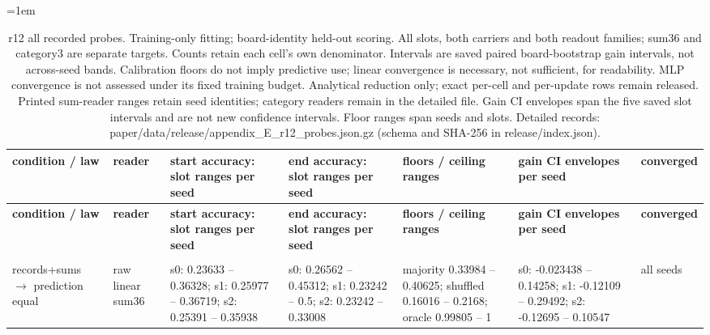 \begingroup\fontsize{8}{9.5}\selectfont\setlength{\tabcolsep}{3pt}\emergencystretch=1em
\begin{longtable}{@{}>{\raggedright\arraybackslash}p{1.392in}>{\raggedright\arraybackslash}p{0.576in}>{\raggedright\arraybackslash}p{0.816in}>{\raggedright\arraybackslash}p{0.816in}>{\raggedright\arraybackslash}p{0.960in}>{\raggedright\arraybackslash}p{0.864in}>{\raggedright\arraybackslash}p{0.576in}@{}}
\caption{r12 all recorded probes. Training-only fitting; board-identity held-out scoring. All slots, both carriers and both readout families; sum36 and category3 are separate targets. Counts retain each cell's own denominator. Intervals are saved paired board-bootstrap gain intervals, not across-seed bands. Calibration floors do not imply predictive use; linear convergence is necessary, not sufficient, for readability. MLP convergence is not assessed under its fixed training budget. Analytical reduction only; exact per-cell and per-update rows remain released. Printed sum-reader ranges retain seed identities; category readers remain in the detailed file. Gain CI envelopes span the five saved slot intervals and are not new confidence intervals. Floor ranges span seeds and slots. Detailed records: paper/\allowbreak{}data/\allowbreak{}release/\allowbreak{}appendix\_\allowbreak{}E\_\allowbreak{}r12\_\allowbreak{}probes.json.gz (schema and SHA-256 in release/\allowbreak{}index.json).}\label{tab:appendix_E_r12_probes}\\
\toprule
\textbf{condition /\allowbreak{} law} & \textbf{reader} & \textbf{start accuracy: slot ranges per seed} & \textbf{end accuracy: slot ranges per seed} & \textbf{floors /\allowbreak{} ceiling ranges} & \textbf{gain CI envelopes per seed} & \textbf{converged} \\
\midrule\endfirsthead
\toprule
\textbf{condition /\allowbreak{} law} & \textbf{reader} & \textbf{start accuracy: slot ranges per seed} & \textbf{end accuracy: slot ranges per seed} & \textbf{floors /\allowbreak{} ceiling ranges} & \textbf{gain CI envelopes per seed} & \textbf{converged} \\
\midrule\endhead
\midrule\multicolumn{7}{r}{Continued on next page}\\\endfoot
\bottomrule\endlastfoot
records+sums $\to$ prediction equal & raw linear sum36 & s0: 0.23633 -- 0.36328; s1: 0.25977 -- 0.36719; s2: 0.25391 -- 0.35938 & s0: 0.26562 -- 0.45312; s1: 0.23242 -- 0.5; s2: 0.23242 -- 0.33008 & majority 0.33984 -- 0.40625; shuffled 0.16016 -- 0.2168; oracle 0.99805 -- 1 & s0: -0.023438 -- 0.14258; s1: -0.12109 -- 0.29492; s2: -0.12695 -- 0.10547 & all seeds \\

\end{longtable}
